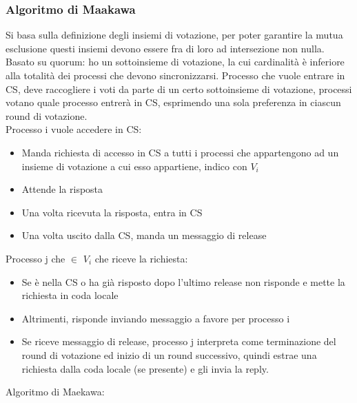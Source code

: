 \documentclass{article}
\begin{document}
\subsubsection{Algoritmo di Maakawa}
Si basa sulla definizione degli insiemi di votazione, per poter garantire la mutua esclusione questi insiemi devono essere fra di loro ad intersezione non nulla. Basato su quorum: ho un sottoinsieme di votazione, la cui cardinalità è inferiore alla totalità dei processi che devono sincronizzarsi. Processo che vuole entrare in CS, deve raccogliere i voti da parte di un certo sottoinsieme di votazione, processi votano quale processo entrerà in CS, esprimendo una sola preferenza in ciascun round di votazione.\\ Processo i vuole accedere in CS:
\begin{itemize}
\item Manda richiesta di accesso in CS a tutti i processi che appartengono ad un insieme di votazione a cui esso appartiene, indico con $V_i$
\item Attende la risposta
\item Una volta ricevuta la risposta, entra in CS
\item Una volta uscito dalla CS, manda un messaggio di release 
\end{itemize}
Processo j che $\in$ $V_i$ che riceve la richiesta:
\begin{itemize}
\item Se è nella CS o ha già risposto dopo l'ultimo release non risponde e mette la richiesta in coda locale
\item Altrimenti, risponde inviando messaggio a favore per processo i
\item Se riceve messaggio di release, processo j interpreta come terminazione del round di votazione ed inizio di un round successivo, quindi estrae una richiesta dalla coda locale (se presente) e gli invia la reply.
\end{itemize}
Algoritmo di Maekawa:
\end{document}
